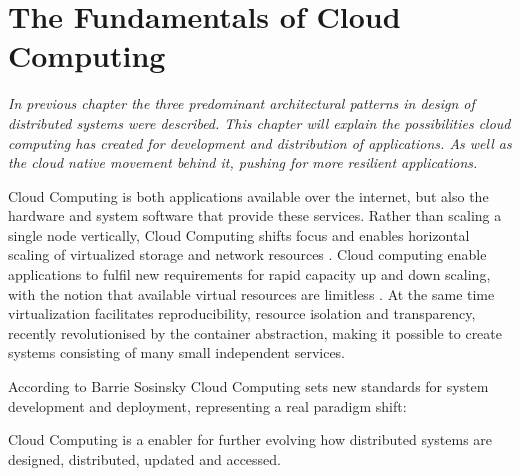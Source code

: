 \chapter{The Fundamentals of Cloud Computing}
\label{ch:cloud_computing}

\textit{In previous chapter the three predominant architectural patterns in design of distributed systems were described. This chapter will explain the possibilities cloud computing has created for development and distribution of applications. As well as the cloud native movement behind it, pushing for more resilient applications.}

Cloud Computing is both applications available over the internet, but also the hardware and system software that provide these services.
Rather than scaling a single node vertically, Cloud Computing shifts focus and enables horizontal scaling of virtualized storage and network resources \cite{armbrust2010view}. Cloud computing enable applications to fulfil new requirements for rapid capacity up and down scaling, with the notion that available virtual resources are limitless \cite{sosinsky2010cloud}. At the same time virtualization facilitates reproducibility, resource isolation and transparency, recently revolutionised by the container abstraction, making it possible to create systems consisting of many small independent services. 

According to Barrie Sosinsky \cite[p. 3 ]{sosinsky2010cloud} Cloud Computing sets new standards for system development and deployment, representing a real paradigm shift:


Cloud Computing is a enabler for further evolving how distributed systems are designed, distributed, updated and accessed. 


